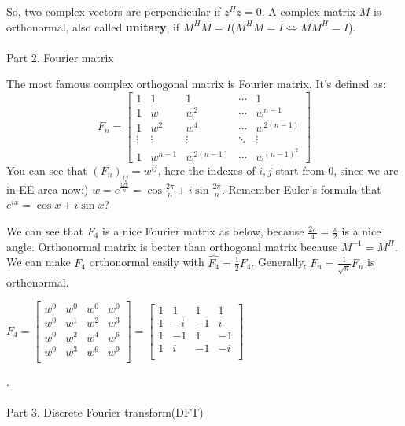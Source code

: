 \documentclass{article}
\begin{document}
\begin{spacing}{1.5}
So, two complex vectors are perpendicular  if $z^Hz=0$. A complex matrix $M$ is orthonormal, also called {\bfseries unitary}, if $M^H M=I$($M^H M=I \Leftrightarrow MM^H=I$).
\\\\Part 2. Fourier matrix

The most famous complex orthogonal matrix is Fourier matrix. It's defined as:
$$
F_n =
\begin{bmatrix}
1 & 1 & 1 & \cdots & 1\\
1 & w & w^2 & \cdots & w^{n-1}\\
1 & w^2 & w^4 & \cdots & w^{2(n-1)}\\
\vdots &\vdots&  \vdots & \ddots &  \vdots \\
1 & w^{n-1} & w^{2(n-1)} & \cdots & w^{(n-1)^2}
\end{bmatrix}
$$
You can see that $(F_n)_{ij}=w^{ij}$, here the indexes of $i, j$ start from 0, since we are in EE area now:) $w=e^{\frac{i2\pi}{n}}=\cos \frac{2\pi}{n} + i\sin \frac{2\pi}{n}$. Remember Euler's formula that $e^{ix}=\cos x+i\sin x$? 

We can see that $F_4$ is a nice Fourier matrix as below, because $\frac{2\pi}{4}=\frac{\pi}{2}$ is a nice angle. Orthonormal matrix is better than orthogonal matrix because $M^{-1}=M^H$. We can make $F_4$ orthonormal easily with $\hat {F_4}=\frac{1}{2}F_4$. Generally, $\hat {F_n}=\frac{1}{\sqrt n}F_n$ is orthonormal.

\begin{center}
$ F_4={
	\begin{bmatrix}
	w ^{0}&w ^{0}&w ^{0}&w ^{0}
	\\w ^{0}&w ^{1}&w ^{2}&w ^{3}
	\\w ^{0}&w ^{2}&w ^{4}&w ^{6}
	\\w^{0}&w^{3}&w^{6}&w^{9}
	\\ \end
	{bmatrix}}
=
	{\begin{bmatrix}
	1&1&1&1\\
	1&-i&-1&i\\
	1&-1&1&-1\\
	1&i&-1&-i \\
	\end{bmatrix}}$
\end{center}

			.  	 	
\\\\Part 3. Discrete Fourier transform(DFT)


\end{spacing}
\end{document}
